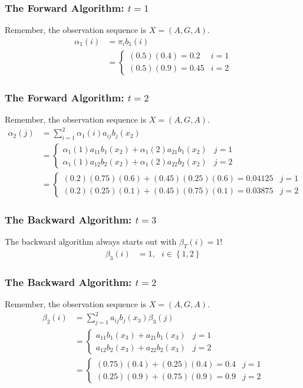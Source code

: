 \documentclass{beamer}
\begin{document}
\begin{frame}
  \frametitle{The Forward Algorithm: $t=1$}

  Remember, the observation sequence is $X=(A,G,A)$.
  \begin{align*}
  \alpha_1(i) &= \pi_i b_1(i) \\
  &= \begin{cases} (0.5)(0.4)=0.2  & i=1\\(0.5)(0.9)=0.45 & i=2\end{cases}
  \end{align*}
\end{frame}

\begin{frame}
  \frametitle{The Forward Algorithm: $t=2$}

  Remember, the observation sequence is $X=(A,G,A)$.
  \begin{align*}
  \alpha_2(j) &= \sum_{i=1}^2 \alpha_1(i)a_{ij}b_j(x_2)\\
  &= \begin{cases}
    \alpha_1(1)a_{11}b_1(x_2)+\alpha_1(2)a_{21}b_1(x_2) & j=1\\
    \alpha_1(1)a_{12}b_2(x_2)+\alpha_1(2)a_{22}b_2(x_2) & j=2
  \end{cases}\\
  &= \begin{cases}
    (0.2)(0.75)(0.6)+(0.45)(0.25)(0.6)=0.04125  & j=1\\
    (0.2)(0.25)(0.1)+(0.45)(0.75)(0.1)=0.03875 &  j=2
  \end{cases}
  \end{align*}
  
\end{frame}

\begin{frame}
  \frametitle{The Backward Algorithm: $t=3$}

  The backward algorithm always starts out with $\beta_T(i)=1$! 
  \begin{align*}
  \beta_3(i) &= 1,~~~i\in\left\{1,2\right\}
  \end{align*}
  
\end{frame}

\begin{frame}
  \frametitle{The Backward Algorithm: $t=2$}

  Remember, the observation sequence is $X=(A,G,A)$.
  \begin{align*}
  \beta_2(i) &= \sum_{j=1}^2 a_{ij}b_j(x_3)\beta_3(j)\\
  &= \begin{cases}
    a_{11}b_1(x_3)+a_{21}b_1(x_3) & j=1\\
    a_{12}b_2(x_3)+a_{22}b_2(x_3) & j=2
  \end{cases}\\
  &= \begin{cases}
    (0.75)(0.4)+(0.25)(0.4)=0.4 & j=1\\
    (0.25)(0.9)+(0.75)(0.9)=0.9 & j=2
  \end{cases}
  \end{align*}  
\end{frame}
\end{document}
